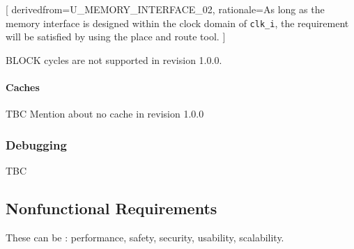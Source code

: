         [
            derivedfrom=U\_MEMORY\_INTERFACE\_02,
            rationale={As long as the memory interface is designed within the clock domain of \texttt{clk\_i}, the requirement will be satisfied by using the place and route tool.}
          ]

        \begin{content}
            BLOCK cycles are not supported in revision 1.0.0.
          \end{content}

      \paragraph{Caches}

        \begin{content}
            TBC Mention about no cache in revision 1.0.0
          \end{content}

    \subsubsection{Debugging}

      \begin{content}
          TBC
        \end{content}

  \subsection{Nonfunctional Requirements}


    \begin{content}
        These can be : performance, safety, security, usability, scalability.
      \end{content}

\newpage
